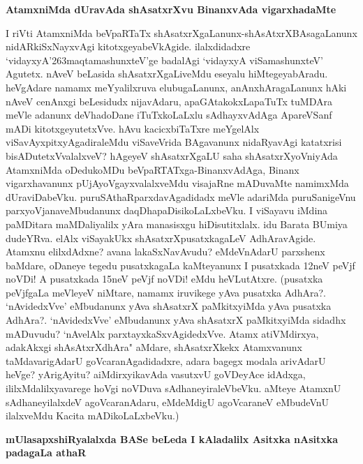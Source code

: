 \noindent
{\bf\large{AtamxniMda dUravAda shAsatxrXvu BinanxvAda vigarxhadaMte}}\label{page188}

I riVti AtamxniMda beVpaRTaTx shAsatxrXgaLanunx-shAsAtxrXBAsagaLanunx nidARkiSxNayxvAgi kitotxgeyabeVkAgide. ilalxdidadxre `vidayxyA\char'263maqtamashunxteV'ge badalAgi `vidayxyA viSamashunxteV' Agutetx. nAveV beLasida shAsatxrXgaLiveMdu eseyalu hiMtegeyabAradu. heVgAdare namamx meYyalilxruva elubugaLanunx, anAnxhAragaLanunx hAki nAveV cenAnxgi beLesidudx nijavAdaru, apaGAtakokxLapaTuTx tuMDAra meVle adanunx deVhadoDane iTuTxkoLaLxlu sAdhayxvAdAga ApareVSanf mADi kitotxgeyutetxVve. hAvu kacicxbiTaTxre meYgelAlx viSavAyxpitxyAgadiraleMdu viSaveVrida BAgavanunx nidaRyavAgi katatxrisi bisADutetxVvalalxveV? hAgeyeV shAsatxrXgaLU saha shAsatxrXyoVniyAda AtamxniMda oDedukoMDu beVpaRTATxga-BinanxvAdAga, Binanx vigarxhavanunx pUjAyoVgayxvalalxveMdu visajaRne mADuvaMte namimxMda dUraviDabeVku. puruSAthaRparxdavAgadidadx meVle adariMda puruSanigeVnu parxyoVjanaveMbudanunx daqDhapaDisikoLaLxbeVku. I viSayavu iMdina paMDitara maMDaliyalilx yAra manasisxgu hiDisutitxlalx. idu Barata BUmiya dudeYRva. elAlx viSayakUkx shAsatxrXpusatxkagaLeV AdhAravAgide. Atamxnu elilxdAdxne? avana lakaSxNavAvudu? eMdeVnAdarU parxshenx baMdare, oDaneye tegedu pusatxkagaLa kaMteyanunx I pusatxkada 12neV peVjf noVDi! A pusatxkada 15neV peVjf noVDi! eMdu heVLutAtxre. (pusatxka peVjfgaLa meVleyeV niMtare, namamx iruvikege yAva pusatxka AdhAra?. `nAvidedxVve' eMbudanunx yAva shAsatxrX paMkitxyiMda yAva pusatxka AdhAra?. `nAvidedxVve' eMbudanunx yAva shAsatxrX paMkitxyiMda sidadhx mADuvudu? `nAvelAlx parxtayxkaSxvAgidedxVve. Atamx atiVMdirxya, adakAkxgi shAsAtxrXdhAra" aMdare, shAsatxrXkekx Atamxvanunx taMdavarigAdarU goVcaranAgadidadxre, adara bagegx modala arivAdarU heVge? yArigAyitu? aiMdirxyikavAda vasutxvU goVDeyAce idAdxga, ililxMdalilxyavarege hoVgi noVDuva sAdhaneyiraleVbeVku. aMteye AtamxnU sAdhaneyilalxdeV agoVcaranAdaru, eMdeMdigU agoVcaraneV eMbudeVnU ilalxveMdu Kacita mADikoLaLxbeVku.)

\noindent
{\bf\large{mUlasapxshiRyalalxda BASe beLeda I kAladalilx Asitxka nAsitxka padagaLa athaR}}\label{page189}

